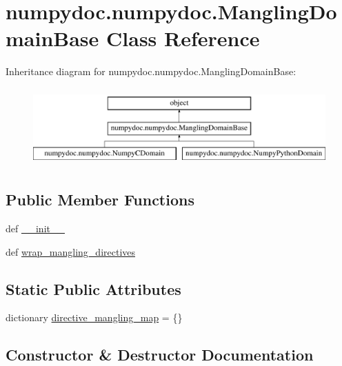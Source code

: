 \hypertarget{classnumpydoc_1_1numpydoc_1_1ManglingDomainBase}{}\section{numpydoc.\+numpydoc.\+Mangling\+Domain\+Base Class Reference}
\label{classnumpydoc_1_1numpydoc_1_1ManglingDomainBase}
Inheritance diagram for numpydoc.\+numpydoc.\+Mangling\+Domain\+Base\+:\begin{figure}[H]
\begin{center}
\leavevmode
\includegraphics[height=3.000000cm]{classnumpydoc_1_1numpydoc_1_1ManglingDomainBase}
\end{center}
\end{figure}
\subsection*{Public Member Functions}
\begin{DoxyCompactItemize}
\item 
def \hyperlink{classnumpydoc_1_1numpydoc_1_1ManglingDomainBase_acecfaddfd1c4c479f30fa63fda374747}{\+\_\+\+\_\+init\+\_\+\+\_\+}
\item 
def \hyperlink{classnumpydoc_1_1numpydoc_1_1ManglingDomainBase_a67dce0c8d294b7191f67ef68c7c9c178}{wrap\+\_\+mangling\+\_\+directives}
\end{DoxyCompactItemize}
\subsection*{Static Public Attributes}
\begin{DoxyCompactItemize}
\item 
dictionary \hyperlink{classnumpydoc_1_1numpydoc_1_1ManglingDomainBase_a73609774530c70f2d3c7ba8f857f70d2}{directive\+\_\+mangling\+\_\+map} = \{\}
\end{DoxyCompactItemize}


\subsection{Constructor \& Destructor Documentation}
\hypertarget{classnumpydoc_1_1numpydoc_1_1ManglingDomainBase_acecfaddfd1c4c479f30fa63fda374747}{}

